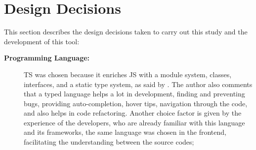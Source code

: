 \section{Design Decisions}\label{sec:ext-design}
This section describes the design decisions taken to carry out this study and the development of this tool:
\begin{description}
    
    \item[\textbf{Programming Language:}] \ac{TS} was chosen because it enriches \ac{JS} with a module system, classes, interfaces, and a static type system, as said by \textcite{Bierman_2014}.
    The author also comments that a typed language helps a lot in development, finding and preventing bugs, providing auto-completion, hover tips, navigation through the code, and also helps in code refactoring.
    Another choice factor is given by the experience of the developers, who are already familiar with this language and its frameworks, the same language was chosen in the frontend, facilitating the understanding between the source codes;
    
    

\end{description}
